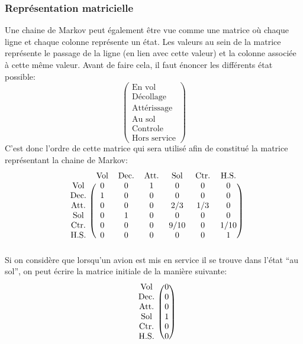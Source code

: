 \documentclass[letterpaper]{article}
\begin{document}
    \subsubsection{Représentation matricielle}
      Une chaine de Markov peut également être vue comme une matrice où chaque ligne et chaque 
      colonne représente un état.  Les valeurs au sein de la matrice représente le passage
      de la ligne (en lien avec cette valeur) et la colonne associée à cette même valeur.
      Avant de faire cela, il faut énoncer les différents état possible:
      $$\begin{pmatrix}
	\text{En vol}\\
	\text{Décollage}\\
	\text{Attérissage}\\
	\text{Au sol}\\
	\text{Controle}\\
	\text{Hors service}\end{pmatrix}$$
      C'est donc l'ordre de cette matrice qui sera utilisé afin de constitué la matrice 
      représentant la chaine de Markov:
      $$
	\begin{blockarray}{ccccccc}
	& \text{Vol} & \text{Dec.} & \text{Att.} & \text{Sol} & \text{Ctr.} & \text{H.S.} \\
	  \begin{block}{c(cccccc)}
	    \text{Vol}  & 0 & 0 & 1 & 0    & 0   & 0    \\
	    \text{Dec.} & 1 & 0 & 0 & 0    & 0   & 0    \\
	    \text{Att.} & 0 & 0 & 0 & 2/3  & 1/3 & 0    \\
	    \text{Sol}  & 0 & 1 & 0 & 0    & 0   & 0    \\
	    \text{Ctr.} & 0 & 0 & 0 & 9/10 & 0   & 1/10 \\
	    \text{H.S.} & 0 & 0 & 0 & 0    & 0   & 1    \\
	  \end{block}
	\end{blockarray}
      $$
      Si on considère que lorsqu'un avion est mis en service il se trouve dans l'état
      ``au sol'', on peut écrire la matrice initiale de la manière suivante:
      $$
	\begin{blockarray}{cc}
	  \begin{block}{c (c)}
	    \text{Vol}  & 0 \\
	    \text{Dec.} & 0 \\
	    \text{Att.} & 0 \\
	    \text{Sol}  & 1 \\
	    \text{Ctr.} & 0 \\
	    \text{H.S.} & 0 \\
	  \end{block}
	\end{blockarray}
      $$
    
\end{document}
